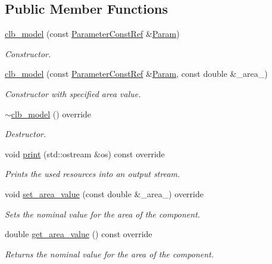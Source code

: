 \subsection*{Public Member Functions}
\begin{DoxyCompactItemize}
\item 
\hyperlink{classclb__model_a7c623f9fa6baec0e8c7ab51aee75b6bb}{clb\+\_\+model} (const \hyperlink{Parameter_8hpp_a37841774a6fcb479b597fdf8955eb4ea}{Parameter\+Const\+Ref} \&\hyperlink{classarea__model_a33c8e77773f9fa818980e4b35e8d8851}{Param})
\begin{DoxyCompactList}\small\item\em Constructor. \end{DoxyCompactList}\item 
\hyperlink{classclb__model_a0059d23bad0d3edef661789073b3d0ea}{clb\+\_\+model} (const \hyperlink{Parameter_8hpp_a37841774a6fcb479b597fdf8955eb4ea}{Parameter\+Const\+Ref} \&\hyperlink{classarea__model_a33c8e77773f9fa818980e4b35e8d8851}{Param}, const double \&\+\_\+area\+\_\+)
\begin{DoxyCompactList}\small\item\em Constructor with specified area value. \end{DoxyCompactList}\item 
\hyperlink{classclb__model_a897a10509fa43b2b61f48c59a0ef880d}{$\sim$clb\+\_\+model} () override
\begin{DoxyCompactList}\small\item\em Destructor. \end{DoxyCompactList}\item 
void \hyperlink{classclb__model_ab65361824b8e850bc109193b5aab23c5}{print} (std\+::ostream \&os) const override
\begin{DoxyCompactList}\small\item\em Prints the used resources into an output stream. \end{DoxyCompactList}\item 
void \hyperlink{classclb__model_ab3e3b52cff76fd2e46d9ac84b83dd456}{set\+\_\+area\+\_\+value} (const double \&\+\_\+area\+\_\+) override
\begin{DoxyCompactList}\small\item\em Sets the nominal value for the area of the component. \end{DoxyCompactList}\item 
double \hyperlink{classclb__model_ad974c55b8a7022c383d3f9447d887dbb}{get\+\_\+area\+\_\+value} () const override
\begin{DoxyCompactList}\small\item\em Returns the nominal value for the area of the component. \end{DoxyCompactList}\item 

\end{DoxyCompactItemize}
